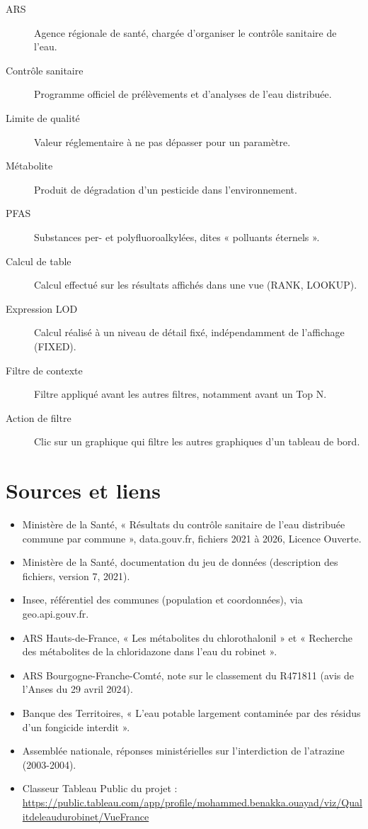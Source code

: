 \documentclass[11pt,a4paper]{article}
\begin{document}
\begin{description}
  \item[ARS] Agence régionale de santé, chargée d'organiser le contrôle sanitaire de l'eau.
  \item[Contrôle sanitaire] Programme officiel de prélèvements et d'analyses de l'eau distribuée.
  \item[Limite de qualité] Valeur réglementaire à ne pas dépasser pour un paramètre.
  \item[Métabolite] Produit de dégradation d'un pesticide dans l'environnement.
  \item[PFAS] Substances per- et polyfluoroalkylées, dites « polluants éternels ».
  \item[Calcul de table] Calcul effectué sur les résultats affichés dans une vue (RANK, LOOKUP).
  \item[Expression LOD] Calcul réalisé à un niveau de détail fixé, indépendamment de l'affichage (FIXED).
  \item[Filtre de contexte] Filtre appliqué avant les autres filtres, notamment avant un Top N.
  \item[Action de filtre] Clic sur un graphique qui filtre les autres graphiques d'un tableau de bord.
\end{description}

\section{Sources et liens}

\begin{itemize}
  \item Ministère de la Santé, « Résultats du contrôle sanitaire de l'eau distribuée commune par commune », data.gouv.fr, fichiers 2021 à 2026, Licence Ouverte.
  \item Ministère de la Santé, documentation du jeu de données (description des fichiers, version 7, 2021).
  \item Insee, référentiel des communes (population et coordonnées), via geo.api.gouv.fr.
  \item ARS Hauts-de-France, « Les métabolites du chlorothalonil » et « Recherche des métabolites de la chloridazone dans l'eau du robinet ».
  \item ARS Bourgogne-Franche-Comté, note sur le classement du R471811 (avis de l'Anses du 29 avril 2024).
  \item Banque des Territoires, « L'eau potable largement contaminée par des résidus d'un fongicide interdit ».
  \item Assemblée nationale, réponses ministérielles sur l'interdiction de l'atrazine (2003-2004).
  \item Classeur Tableau Public du projet :\\ \url{https://public.tableau.com/app/profile/mohammed.benakka.ouayad/viz/Qualitdeleaudurobinet/VueFrance}
\end{itemize}
\end{document}

